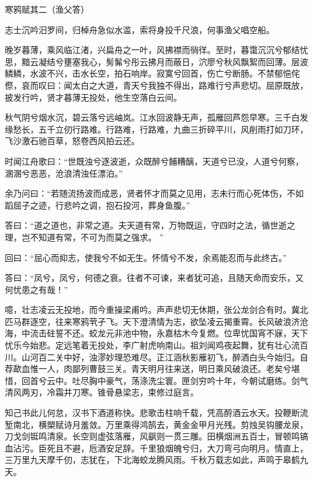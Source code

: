 ﻿
{\kaishu
\begin{center}
\LARGE 寒鸦赋其二（渔父答）
\end{center}
\par
{\centering 志士沉吟汨罗间，归棹舟急似水滥，索将身投千尺浪，何事渔父唱空船。

}
\par
晚岁暮薄，乘风临江渚，兴扁舟之一叶，风拂襟而徜徉。至时，暮霭沉沉兮郁结忧思，黯云凝结兮壅塞我心，髣髴兮彤云拂月而蔽日，泬廖兮秋风飘絮而回薄。层波鳞鳞，水波不兴，击水长空，拍石响岸。寂寞兮回首，伤亡兮断肠。不禁郁悒侘傺，哀而叹曰：闻太白之大道，青天兮我独不得出，路难行兮声悲切。屈原既放，披发行吟，贤才暮薄无投处，他生空落白云间。
\par
秋气阴兮烟水沉，碧云落兮远岫岚。江水回波静无声，孤雁回芦怨早寒。三千白发缘愁长，五千立仞行路难。行路难，行路难，九曲三折碎平川，风削雨打如刀环，飞沙激石驰百草，怒卷西风拍云还。
\par
时闻江舟歌曰：“世既浊兮逐波逝，众既醉兮餔糟醨，天道兮已没，人道兮何察，溷溷兮恶恶，沧浪清浊任漂泊。”
\par
余乃问曰：“若随流扬波而成恶，贤者怀才而莫之见用，志未行而心死体伤，不如蹈屈子之迹，行悲吟之调，抱石投河，葬身鱼腹。”
\par
答曰：“道之道也，非常之道。夫天道有常，万物既运，守四时之法，循世逝之理，岂不知道有常，不可为而莫之强求。 ”
\par
回曰：“屈心而抑志，使我兮不如无生。怀情兮不发，余焉能忍而与此终古。”
\par
答曰：“凤兮，凤兮，何德之衰。往者不可谏，来者犹可追，且随天命而安乐，又何忧患之有哉！”
\par
噫，壮志凌云无投地，而今重操梁甫吟。声声悲切无休期，张公龙剑合有时。冀北匹马群逐空，往来寒鸦茕孑飞。天下澄清情为志，欲坠凌云揭重霄。长风破浪济沧海，中流击砫誓不还。蛟龙元非池中物，永嘉枯木今复燃。位卑忧国宵不寐，天下忧乐今始悲。定远笔着无投处，李广射虎响南山。祖刘闻鸡夜起舞，犹有壮心流百川。山河百二关中好，浊漻妙理恐难尽。正江涵秋影雁初飞，醉酒白头今始归。自荐歃血惟一人，肉鄙列曹鼓三关。青天明月往来送，明日乘风破浪还。老矣兮堪惜，回首兮云中。吐尽胸中豪气，荡涤洗尘寰。匣剑穷吟十年，今朝试磨练。剑气清风两刃，冷霜并刀寒。锥骨悬梁志，束修过庭言。
\par
知己书此儿何怠，汉书下酒道称快。悲歌击柱响千载，凭高酹酒云水天。投鞭断流堑南北，横槊赋诗月羞敛。万里乘得鸿鹄去，黄金金甲月光残。剪烛吴钩腰龙泉，刀戈剑铤鸣清泉。长空则虚弦落雁，风飖则一贯三雕。田横烟洲五百士，冒顿鸣镐血沾污。臣死且不避，卮酒安足辞。千里狼烟魄兮归，大刀弯弓向明月。情直上，三万里九天摩千仞，志犹在，下北海蛟龙腾风雨。千秋万载志如此，声鸣于皋鹤九天。

}


